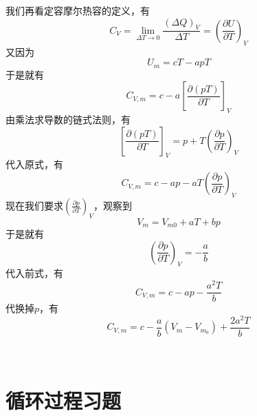 \documentclass[lang=cn,10pt]{elegantbook}
\begin{document}
\begin{solution}
		我们再看定容摩尔热容的定义，有
		\begin{equation*}
				C_{V}=\lim_{\varDelta T\rightarrow 0} \frac{	\left( \varDelta Q \right) _V}{\varDelta T}=\left( \frac{\partial U}{\partial T} \right) _V
		\end{equation*}
		又因为
		\begin{equation*}
			U_{m}=cT-apT
		\end{equation*}
		于是就有
		\begin{equation*}
			C_{V,m}=c-a\left[ \frac{\partial \left( pT \right)}{\partial T} \right] _V
		\end{equation*}
		由乘法求导数的链式法则，有
		\begin{equation*}
			\left[ \frac{\partial \left( pT \right)}{\partial T} \right] _V=p+T(\frac{\partial p}{\partial T})_{V}
		\end{equation*}
		代入原式，有
		\begin{equation*}
			C_{V,m}=c-ap-aT(\frac{\partial p}{\partial T})_{V}
		\end{equation*}
		现在我们要求$(\frac{\partial p}{\partial T})_{V}$，观察到
		\begin{equation*}
			V_{m}=V_{m0}+aT+bp
		\end{equation*}
		于是就有
		\begin{equation*}
			(\frac{\partial p}{\partial T})_{V}=-\frac{a}{b}
		\end{equation*}
		代入前式，有
		\begin{equation*}
			C_{V,m}=c-ap-\frac{a^{2}T}{b}
		\end{equation*}
		代换掉$p$，有
		\begin{equation*}
				C_{V,m}=c-\frac{a}{b}(V_{m}-V_{m_{0}})+\frac{2a^{2}T}{b}
		\end{equation*}
	\end{solution}
	~\\
	\section{循环过程习题}
	
\end{document}
